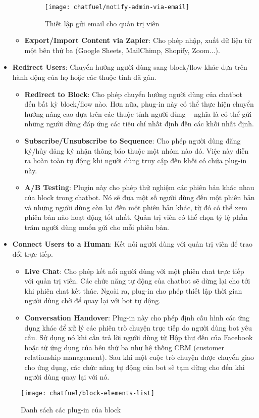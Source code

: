 \begin{itemize}
\begin{itemize}
		\begin{figure}[htb!]\centering
			\texttt{[image: chatfuel/notify-admin-via-email]}
			\caption{Thiết lập gửi email cho quản trị viên}
			\label{fig:fig-s3-11-chatfuel-notify-admin-via-email}
		\end{figure}\par
		\item \textbf{Export/Import Content via Zapier}: Cho phép nhập, xuất dữ liệu từ một bên thứ ba (Google Sheets, MailChimp, Shopify, Zoom...).
	\end{itemize}
	\item \textbf{Redirect Users}: Chuyển hướng người dùng sang block/flow khác dựa trên hành động của họ hoặc các thuộc tính đã gán. \begin{itemize}
		\item \textbf{Redirect to Block}: Cho phép chuyển hướng người dùng của chatbot đến bất kỳ block/flow nào. Hơn nữa, phug-in này có thể thực hiện chuyển hướng nâng cao dựa trên các thuộc tính người dùng – nghĩa là có thể gửi những người dùng đáp ứng các tiêu chí nhất định đến các khối nhất định.
		\item \textbf{Subscribe/Unsubscribe to Sequence}: Cho phép người dùng đăng ký/hủy đăng ký nhận thông báo thuộc một nhóm nào đó. Việc này diễn ra hoàn toàn tự động khi người dùng truy cập đến khối có chứa plug-in này.
		\item \textbf{A/B Testing}: Plugin này cho phép thử nghiệm các phiên bản khác nhau của block trong chatbot. Nó sẽ đưa một số người dùng đến một phiên bản và những người dùng còn lại đến một phiên bản khác, từ đó có thể xem phiên bản nào hoạt động tốt nhất. Quản trị viên có thể chọn tỷ lệ phần trăm người dùng muốn gửi cho mỗi phiên bản.
	\end{itemize}
	\item \textbf{Connect Users to a Human}: Kết nối người dùng với quản trị viên để trao đổi trực tiếp. \begin{itemize}
		\item \textbf{Live Chat}: Cho phép kết nối người dùng với một phiên chat trực tiếp với quản trị viên. Các chức năng tự động của chatbot sẽ dừng lại cho tới khi phiên chat kết thúc. Ngoài ra, plug-in cho phép thiết lập thời gian người dùng chờ để quay lại với bot tự dộng.
		\item \textbf{Conversation Handover}: Plug-in này cho phép định cấu hình các ứng dụng khác để xử lý các phiên trò chuyện trực tiếp do người dùng bot yêu cầu. Sử dụng nó khi cần trả lời người dùng từ Hộp thư đến của Facebook hoặc từ ứng dụng của bên thứ ba như hệ thống CRM (customer relationship management). Sau khi một cuộc trò chuyện được chuyển giao cho ứng dụng, các chức năng tự động của bot sẽ tạm dừng cho đến khi người dùng quay lại với nó.
	\end{itemize}
\end{itemize}
\begin{figure}[htb!]\centering
	\texttt{[image: chatfuel/block-elements-list]}
	\caption{Danh sách các plug-in của block}
	\label{fig:fig-c3-block-elements-list}
\end{figure}

